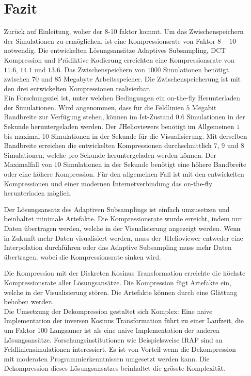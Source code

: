 \section{Fazit}
Zurück auf Einleitung, woher der 8-10 faktor kommt.
Um das Zwischenspeichern der Simulationen zu ermöglichen, ist eine Kompressionsrate von Faktor $8-10$ notwendig. Die entwickelten Lösungsansätze Adaptives Subsampling, DCT Kompression und Prädiktive Kodierung erreichten eine Kompressionsrate von $11.6$, $14.1$ und $13.6$. Das Zwischenspeichern von $1000$ Simulationen benötigt zwischen $70$ und $85$ Megabyte Arbeitsspeicher. Die Zwischenspeicherung ist mit den drei entwickelten Kompressionen realisierbar.\\
Ein Forschungsziel ist, unter welchen Bedingungen ein on-the-fly Herunterladen der Simulationen. Wird angenommen, dass für die Feldlinien $5$ Megabit Bandbreite zur Verfügung stehen, können im Ist-Zustand $0.6$ Simulationen in der Sekunde heruntergeladen werden. Der JHelioviewers benötigt im Allgemeinen $1$ bis maximal $10$ Simulationen in der Sekunde für die Visualisierung. Mit derselben Bandbreite erreichen die entwickelten Kompressionen durchschnittlich $7$, $9$ und $8$ Simulationen, welche pro Sekunde heruntergeladen werden können. Der Maximalfall von $10$ Simulationen in der Sekunde benötigt eine höhere Bandbreite oder eine höhere Kompression. Für den allgemeinen Fall ist mit den entwickelten Kompressionen und einer modernen Internetverbindung das on-the-fly herunterladen möglich. 
 
Der Lösungsansatz des Adaptiven Subsamplings ist einfach umzusetzen und beinhaltet minimale Artefakte. Die Kompressionsrate wurde erreicht, indem nur Daten übertragen werden, welche in der Visualisierung angezeigt werden. Wenn in Zukunft mehr Daten visualisiert werden, muss der JHelioviewer entweder eine Interpolation durchführen oder das Adaptive Subsampling muss mehr Daten übertragen, wobei die Kompressionsrate sinken wird.

Die Kompression mit der Diskreten Kosinus Transformation erreichte die höchste Kompressionsrate aller Lösungsansätze. Die Kompression fügt Artefakte ein, welche in der Visualisierung stören. Die Artefakte können durch eine Glättung behoben werden.\\
Die Umsetzung der Dekompression gestaltet sich Komplex: Eine naive Implementation der inversen Kosinus Transformation führt zu einer Laufzeit, die um Faktor $100$ Langsamer ist als eine naive Implementation der anderen Lösungsansätze. Forschungsinstitutionen wie Beispielsweise IRAP\cite{website:irap} sind an Feldliniensimulationen interessiert. Es ist von Vorteil wenn die Dekompression mit moderaten Programmierkenntnissen umgesetzt werden kann. Die Dekompression dieses Lösungsansatzes beinhaltet die grösste Komplexität.

